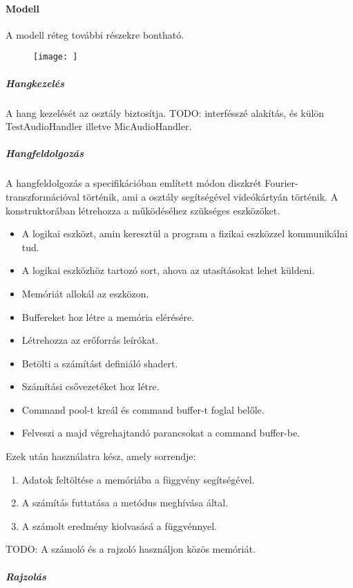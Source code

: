 \paragraph{Modell}
A modell r\'eteg tov\'abbi r\'eszekre bonthat\'o.
\begin{figure}[h]
	\texttt{[image: ]}
\end{figure}

\subparagraph{Hangkezel\'es}
A hang kezel\'es\'et az  oszt\'aly biztos\'itja.
TODO: interf\'essz\'e alak\'it\'as, \'es k\"ul\"on TestAudioHandler illetve MicAudioHandler.

\subparagraph{Hangfeldolgoz\'as}
A hangfeldolgoz\'as a specifik\'aci\'oban eml\'itett m\'odon diszkr\'et Fourier-transzform\'aci\'oval t\"ort\'enik, ami a  oszt\'aly seg\'its\'eg\'evel vide\'ok\'arty\'an t\"ort\'enik.
A konstruktor\'aban l\'etrehozza a m\H uk\"od\'es\'ehez sz\"uks\'eges eszk\"oz\"oket. 
\begin{itemize}
	\item A logikai eszk\"ozt, amin kereszt\"ul a program a fizikai eszk\"ozzel kommunik\'alni tud.
	\item A logikai eszk\"ozh\"oz tartoz\'o sort, ahova az utas\'it\'asokat lehet k\"uldeni.
	\item Mem\'ori\'at allok\'al az eszk\"ozon.
	\item Buffereket hoz l\'etre a mem\'oria el\'er\'es\'ere.
	\item L\'etrehozza az er\H oforr\'as le\'ir\'okat.
	\item Bet\"olti a sz\'am\'it\'ast defini\'al\'o shadert.
	\item Sz\'am\'it\'asi cs\H ovezet\'eket hoz l\'etre.
	\item Command pool-t kre\'al \'es command buffer-t foglal bel\H ole.
	\item Felveszi a majd v\'egrehajtand\'o parancsokat a command buffer-be.
\end{itemize}

Ezek ut\'an haszn\'alatra k\'esz, amely sorrendje:
\begin{enumerate}
	\item Adatok felt\"olt\'ese a mem\'ori\'aba a  f\"uggv\'eny seg\'its\'eg\'evel.
	\item A sz\'am\'it\'as futtat\'asa a  met\'odus megh\'iv\'asa \'altal.
	\item A sz\'amolt eredm\'eny kiolvas\'as\'a a  f\"uggv\'ennyel.
\end{enumerate}
TODO: A sz\'amol\'o \'es a rajzol\'o haszn\'aljon k\"oz\"os mem\'ori\'at.

\subparagraph{Rajzol\'as}

